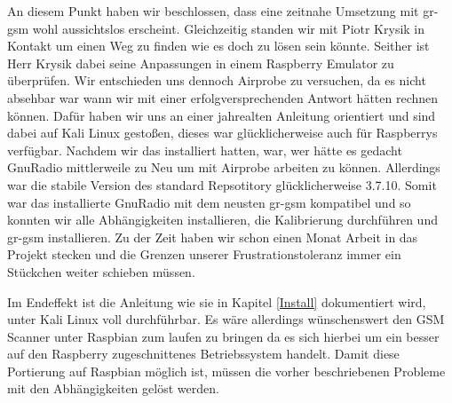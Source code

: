 An diesem Punkt haben wir beschlossen, dass eine zeitnahe Umsetzung mit gr-gsm wohl aussichtslos erscheint. Gleichzeitig standen wir mit Piotr Krysik in Kontakt um einen Weg zu finden wie es doch zu lösen sein könnte. Seither ist Herr Krysik dabei seine Anpassungen in einem Raspberry Emulator zu überprüfen. Wir entschieden uns dennoch Airprobe zu versuchen, da es nicht absehbar war wann wir mit einer erfolgversprechenden Antwort hätten rechnen können. Dafür haben wir uns an einer jahrealten Anleitung orientiert und sind dabei auf Kali Linux gestoßen, dieses war glücklicherweise auch für Raspberrys verfügbar. Nachdem wir das installiert hatten, war, wer hätte es gedacht GnuRadio mittlerweile zu Neu um mit Airprobe arbeiten zu können. Allerdings war die stabile Version des standard Repsotitory glücklicherweise 3.7.10. Somit war das installierte GnuRadio mit dem neusten gr-gsm kompatibel und so konnten wir alle Abhängigkeiten installieren, die Kalibrierung durchführen und gr-gsm installieren. Zu der Zeit haben wir schon einen Monat Arbeit in das Projekt stecken und die Grenzen unserer Frustrationstoleranz immer ein Stückchen weiter schieben müssen.

Im Endeffekt ist die Anleitung wie sie in Kapitel \ref{Install} dokumentiert wird, unter Kali Linux voll durchführbar. Es wäre allerdings wünschenswert den GSM Scanner unter Raspbian zum laufen zu bringen da es sich hierbei um ein besser auf den Raspberry zugeschnittenes Betriebssystem handelt. 
Damit diese Portierung auf Raspbian möglich ist, müssen die vorher beschriebenen Probleme mit den Abhängigkeiten gelöst werden. 

